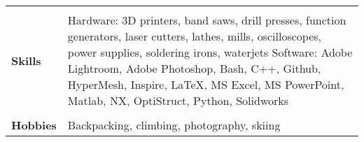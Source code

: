 \documentclass[12pt]{article}
\begin{document}
\begin{table}[H]
\begin{tabularx}{\textwidth}{@{}X p{6.25in} @{}}
		 & \\

		\textbf{Skills} & 
		Hardware: 
		3D printers, band saws, drill presses, function generators, laser cutters, lathes, mills, oscilloscopes, power supplies, soldering irons, waterjets \vspace{0.0625in} \newline 
		Software: 
		Adobe Lightroom, Adobe Photoshop, Bash, C++, Github, HyperMesh, Inspire, \LaTeX, MS Excel, MS PowerPoint, Matlab, NX, OptiStruct, Python, Solidworks \\

		 & \\

		\textbf{Hobbies} & Backpacking, climbing, photography, skiing \\
		
	\end{tabularx}
\end{table}
\end{document}
